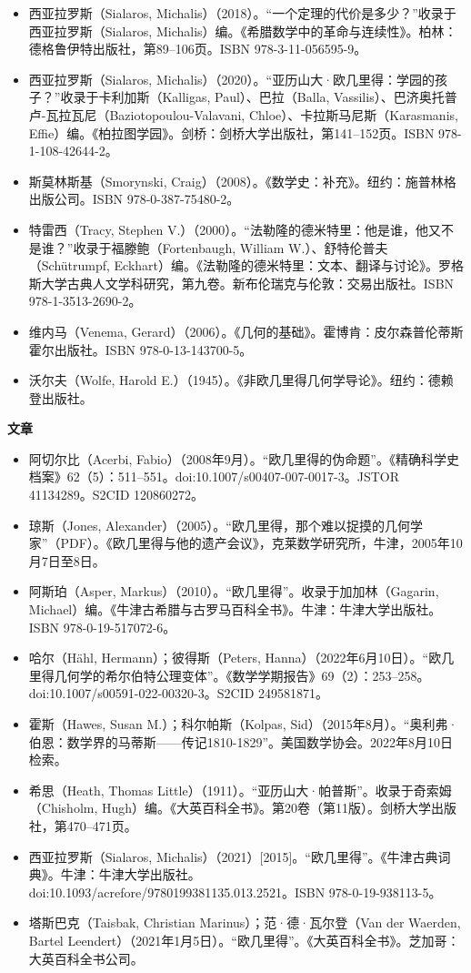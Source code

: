 \begin{itemize}
\item 西亚拉罗斯（Sialaros, Michalis）（2018）。“一个定理的代价是多少？”收录于西亚拉罗斯（Sialaros, Michalis）编。《希腊数学中的革命与连续性》。柏林：德格鲁伊特出版社，第89–106页。ISBN 978-3-11-056595-9。  
\item 西亚拉罗斯（Sialaros, Michalis）（2020）。“亚历山大·欧几里得：学园的孩子？”收录于卡利加斯（Kalligas, Paul）、巴拉（Balla, Vassilis）、巴济奥托普卢-瓦拉瓦尼（Baziotopoulou-Valavani, Chloe）、卡拉斯马尼斯（Karasmanis, Effie）编。《柏拉图学园》。剑桥：剑桥大学出版社，第141–152页。ISBN 978-1-108-42644-2。  
\item 斯莫林斯基（Smorynski, Craig）（2008）。《数学史：补充》。纽约：施普林格出版公司。ISBN 978-0-387-75480-2。
\item 特雷西（Tracy, Stephen V.）（2000）。“法勒隆的德米特里：他是谁，他又不是谁？”收录于福滕鲍（Fortenbaugh, William W.）、舒特伦普夫（Schütrumpf, Eckhart）编。《法勒隆的德米特里：文本、翻译与讨论》。罗格斯大学古典人文学科研究，第九卷。新布伦瑞克与伦敦：交易出版社。ISBN 978-1-3513-2690-2。  
\item 维内马（Venema, Gerard）（2006）。《几何的基础》。霍博肯：皮尔森普伦蒂斯霍尔出版社。ISBN 978-0-13-143700-5。  
\item 沃尔夫（Wolfe, Harold E.）（1945）。《非欧几里得几何学导论》。纽约：德赖登出版社。
\end{itemize}

\textbf{文章}  

\begin{itemize}
\item 阿切尔比（Acerbi, Fabio）（2008年9月）。“欧几里得的伪命题”。《精确科学史档案》62（5）：511–551。doi:10.1007/s00407-007-0017-3。JSTOR 41134289。S2CID 120860272。  
\item 琼斯（Jones, Alexander）（2005）。“欧几里得，那个难以捉摸的几何学家”（PDF）。《欧几里得与他的遗产会议》，克莱数学研究所，牛津，2005年10月7日至8日。  
\item 阿斯珀（Asper, Markus）（2010）。“欧几里得”。收录于加加林（Gagarin, Michael）编。《牛津古希腊与古罗马百科全书》。牛津：牛津大学出版社。ISBN 978-0-19-517072-6。  
\item 哈尔（Hähl, Hermann）；彼得斯（Peters, Hanna）（2022年6月10日）。“欧几里得几何学的希尔伯特公理变体”。《数学学期报告》69（2）：253–258。doi:10.1007/s00591-022-00320-3。S2CID 249581871。  
\item 霍斯（Hawes, Susan M.）；科尔帕斯（Kolpas, Sid）（2015年8月）。“奥利弗·伯恩：数学界的马蒂斯——传记1810-1829”。美国数学协会。2022年8月10日检索。  
\item 希思（Heath, Thomas Little）（1911）。“亚历山大·帕普斯”。收录于奇索姆（Chisholm, Hugh）编。《大英百科全书》。第20卷（第11版）。剑桥大学出版社，第470–471页。  
\item 西亚拉罗斯（Sialaros, Michalis）（2021）[2015]。“欧几里得”。《牛津古典词典》。牛津：牛津大学出版社。doi:10.1093/acrefore/9780199381135.013.2521。ISBN 978-0-19-938113-5。  
\item 塔斯巴克（Taisbak, Christian Marinus）；范·德·瓦尔登（Van der Waerden, Bartel Leendert）（2021年1月5日）。“欧几里得”。《大英百科全书》。芝加哥：大英百科全书公司。
\end{itemize}